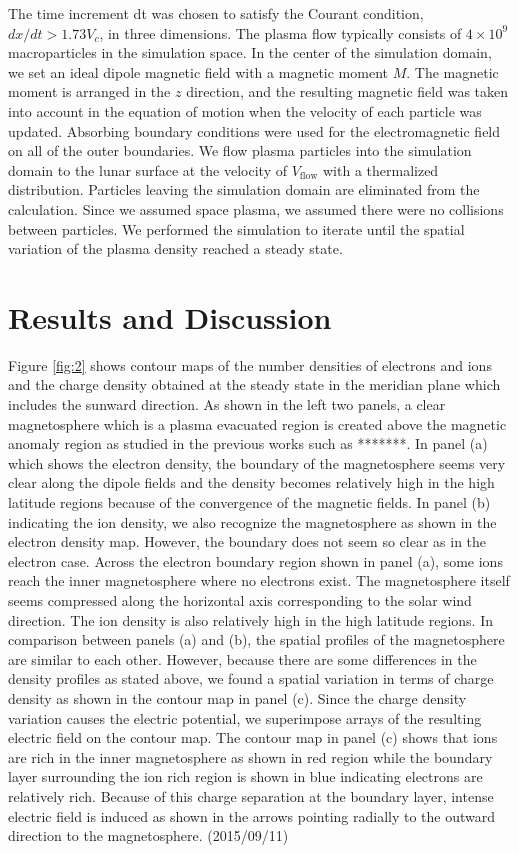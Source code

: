 \documentclass{EPS}
\begin{document}
The time increment dt was chosen to satisfy the Courant condition, $dx/dt > 1.73 V_c $, in three dimensions. 
The plasma flow typically consists of $4 \times 10^9 $ macroparticles in the simulation space. 
In the center of the simulation domain, we set an ideal dipole magnetic field with a magnetic moment $M$. 
The magnetic moment is arranged in the $z$ direction, and the resulting magnetic field was taken into account in the equation of motion when the velocity of each particle was updated. 
Absorbing boundary conditions were used for the electromagnetic field on all of the outer boundaries. 
We flow plasma particles into the simulation domain to the lunar surface at the velocity of $V_\mathrm{flow}$
with a thermalized distribution. Particles leaving the simulation domain are eliminated from the calculation. 
Since we assumed space plasma, we assumed there were no collisions between particles. 
We performed the simulation to iterate until the spatial variation of the plasma density reached a steady state. 


\section{Results and Discussion}


Figure \ref{fig:2} shows contour maps of the number densities of electrons and ions and the charge 
density obtained at the steady state in the meridian plane which includes the sunward direction. 
As shown in the left two panels, a clear magnetosphere which is a plasma evacuated region is 
created above the magnetic anomaly region as studied in the previous works such as *******. 
In panel (a) which shows the electron density, the boundary of the magnetosphere seems 
very clear along the dipole fields and the density becomes relatively high in the high latitude regions 
because of the convergence of the magnetic fields.  
In panel (b) indicating the ion density, we also recognize the magnetosphere as shown in the electron density map. 
However, the boundary does not seem so clear as in the electron case. 
Across the electron boundary region shown in panel (a), some ions reach the inner magnetosphere 
where no electrons exist. 
The magnetosphere itself seems compressed along the horizontal axis corresponding to the solar wind direction. 
The ion density is also relatively high in the high latitude regions. 
In comparison between panels (a) and (b), the spatial profiles of the magnetosphere are similar to each other. 
However, because there are some differences in the density profiles as stated above, 
we found a spatial variation in terms of charge density as shown in the contour map in panel (c). 
Since the charge density variation causes the electric potential, 
we superimpose arrays of the resulting electric field on the contour map. 
The contour map in panel (c) shows that ions are rich in the inner magnetosphere as shown in red region 
while the boundary layer surrounding the ion rich region is shown in blue indicating electrons are relatively rich. 
Because of this charge separation at the boundary layer, intense electric field is induced 
as shown in the arrows pointing radially to the outward direction to the magnetosphere.  (2015/09/11)
\end{document}
